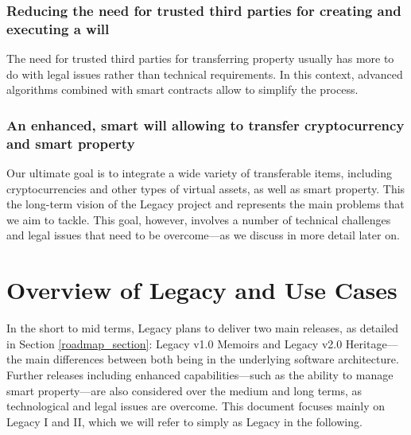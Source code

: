 \subsubsection*{Reducing the need for trusted third parties for creating and executing a will} %
\label{ssub:reducing_the_need_for_trusted_third_parties_for_creating_and_executing_a_will}
The need for trusted third parties for transferring property usually has more to do with legal issues rather than technical requirements. In this context, advanced algorithms combined with smart contracts allow to simplify the process.

\subsubsection*{An enhanced, smart will allowing to transfer cryptocurrency and smart property} %
\label{ssub:_an_enhanced_smart_will_allowing_to_transfer_cryptocurrency_and_smart_property_}
Our ultimate goal is to integrate a wide variety of transferable items, including cryptocurrencies and other types of virtual assets, as well as smart property. This the long-term vision of the Legacy project and represents the main problems that we aim to tackle. This goal, however, involves a number of technical challenges and legal issues that need to be overcome---as we discuss in more detail later on.


\section{Overview of Legacy and Use Cases} %
\label{sec:overview_of_legacy_and_use_cases}
In the short to mid terms, Legacy plans to deliver two main releases, as detailed in Section \ref{roadmap_section}: Legacy v1.0 Memoirs and Legacy v2.0 Heritage---the main differences between both being in the underlying software architecture.  Further releases including enhanced capabilities---such as the ability to manage smart property---are also considered over the medium and long terms, as technological and legal issues are overcome. This document focuses mainly on Legacy I and II, which we will refer to simply as Legacy in the following. 

